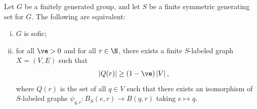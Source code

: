 \documentclass[10pt]{mypackage}
\begin{document}
\begin{theorem}
  Let $G$ be a finitely generated group, and let $S$ be a finite symmetric generating set for $G$. The following are equivalent:
  \begin{enumerate}[(i)]
    \item $G$ is sofic;
    \item for all $\ve > 0$ and for all $r\in \N$, there exists a finite $S$-labeled graph $X = \left( V,E \right)$ such that
      \begin{align*}
        \left\vert Q(r) \right\vert &\geq \left( 1-\ve \right)\left\vert V \right\vert,
      \end{align*}
      where $Q(r)$ is the set of all $q\in V$ such that there exists an isomorphism of $S$-labeled graphs $\psi_{q,r}\colon B_S\left( e,r \right)\rightarrow B\left( q,r \right)$ taking $e\mapsto q$.
  \end{enumerate}
\end{theorem}
\end{document}
